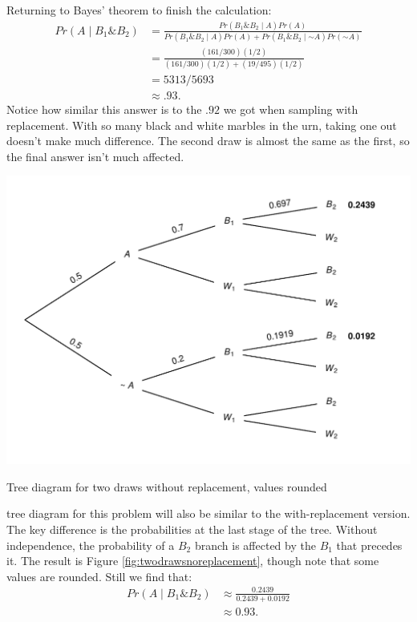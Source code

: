 \documentclass[justified]{tufte-book}
\newcommand{\given}{\mid}
\renewcommand{\neg}{\mathbin{\sim}}
\renewcommand{\wedge}{\mathbin{\&}}
\newcommand{\p}{Pr}
\theoremstyle{definition}
\theoremstyle{definition}
\theoremstyle{definition}
\theoremstyle{remark}
\begin{document}
Returning to Bayes' theorem to finish the calculation:
\[
  \begin{aligned}
    \p(A \given B_1 \wedge B_2) &= \frac{\p(B_1 \wedge B_2 \given A)\p(A)}{\p(B_1 \wedge B_2 \given A) \p(A) + \p(B_1 \wedge B_2 \given \neg A) \p(\neg A)} \\
      &= \frac{(161/300)(1/2)}{(161/300)(1/2) + (19/495)(1/2)} \\
      &= 5313/5693 \\
      &\approx .93. 
  \end{aligned}
\]
Notice how similar this answer is to the \(.92\) we got when sampling with replacement. With so many black and white marbles in the urn, taking one out doesn't make much difference. The second draw is almost the same as the first, so the final answer isn't much affected.

\begin{marginfigure}
\includegraphics{_main_files/figure-latex/twodrawsnoreplacement-11} \caption[Tree diagram for two draws without replacement, values rounded]{Tree diagram for two draws without replacement, values rounded}\label{fig:twodrawsnoreplacement}
\end{marginfigure}

 tree diagram for this problem will also be similar to the with-replacement version. The key difference is the probabilities at the last stage of the tree. Without independence, the probability of a \(B_2\) branch is affected by the \(B_1\) that precedes it. The result is Figure \ref{fig:twodrawsnoreplacement}, though note that some values are rounded. Still we find that:
\[
  \begin{aligned}
     \p(A \given B_1 \wedge B_2) &\approx \frac{ 0.2439 }{ 0.2439 + 0.0192 } \\
                                 &\approx 0.93.
  \end{aligned}
\]
\end{document}
